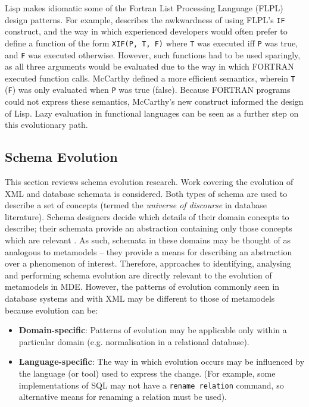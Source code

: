 Lisp makes idiomatic some of the Fortran List Processing Language (FLPL) design patterns. For example, \cite{mcarthy78lisp} describes the awkwardness of using FLPL's \verb|IF| construct, and the way in which experienced developers would often prefer to define a function of the form \verb|XIF(P, T, F)| where \verb|T| was executed iff \verb|P| was true, and \verb|F| was executed otherwise. However, such functions had to be used sparingly, as all three arguments would be evaluated due to the way in which FORTRAN executed function calls. McCarthy \cite{mcarthy78lisp} defined a more efficient semantics, wherein \verb|T| (\verb|F|) was only evaluated when  \verb|P| was true (false). Because FORTRAN programs could not express these semantics, McCarthy's new construct informed the design of Lisp. Lazy evaluation in functional languages can be seen as a further step on this evolutionary path.


\subsection{Schema Evolution}
\label{subsec:schema_evolution}
This section reviews schema evolution research. Work covering the evolution of XML and database schemata is considered. Both types of schema are used to describe a set of concepts (termed the \textit{universe of discourse} in database literature). Schema designers decide which details of their domain concepts to describe; their schemata provide an abstraction containing only those concepts which are relevant \cite[pg. 30]{elmasri06database}. As such, schemata in these domains may be thought of as analogous to metamodels -- they provide a means for describing an abstraction over a phenomenon of interest. Therefore, approaches to identifying, analysing and performing schema evolution are directly relevant to the evolution of metamodels in MDE. However, the patterns of evolution commonly seen in database systems and with XML may be different to those of metamodels because evolution can be:

\begin{itemize}
 \item \textbf{Domain-specific}: Patterns of evolution may be applicable only within a particular domain (e.g. normalisation in a relational database).
 \item \textbf{Language-specific}: The way in which evolution occurs may be influenced by the language (or tool) used to express the change. (For example, some implementations of SQL may not have a \texttt{rename relation} command, so alternative means for renaming a relation must be used).
\end{itemize}

